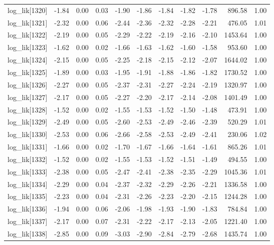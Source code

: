 \begin{table}[ht]
\begin{tabular}{rrrrrrrrrrr}
  log\_lik[1320] & -1.84 & 0.00 & 0.03 & -1.90 & -1.86 & -1.84 & -1.82 & -1.78 & 896.58 & 1.00 \\ 
  log\_lik[1321] & -2.32 & 0.00 & 0.06 & -2.44 & -2.36 & -2.32 & -2.28 & -2.21 & 476.05 & 1.01 \\ 
  log\_lik[1322] & -2.19 & 0.00 & 0.05 & -2.29 & -2.22 & -2.19 & -2.16 & -2.10 & 1453.64 & 1.00 \\ 
  log\_lik[1323] & -1.62 & 0.00 & 0.02 & -1.66 & -1.63 & -1.62 & -1.60 & -1.58 & 953.60 & 1.00 \\ 
  log\_lik[1324] & -2.15 & 0.00 & 0.05 & -2.25 & -2.18 & -2.15 & -2.12 & -2.07 & 1644.02 & 1.00 \\ 
  log\_lik[1325] & -1.89 & 0.00 & 0.03 & -1.95 & -1.91 & -1.88 & -1.86 & -1.82 & 1730.52 & 1.00 \\ 
  log\_lik[1326] & -2.27 & 0.00 & 0.05 & -2.37 & -2.31 & -2.27 & -2.24 & -2.19 & 1320.97 & 1.00 \\ 
  log\_lik[1327] & -2.17 & 0.00 & 0.05 & -2.27 & -2.20 & -2.17 & -2.14 & -2.08 & 1401.49 & 1.00 \\ 
  log\_lik[1328] & -1.52 & 0.00 & 0.02 & -1.55 & -1.53 & -1.52 & -1.50 & -1.48 & 473.91 & 1.00 \\ 
  log\_lik[1329] & -2.49 & 0.00 & 0.05 & -2.60 & -2.53 & -2.49 & -2.46 & -2.39 & 520.29 & 1.01 \\ 
  log\_lik[1330] & -2.53 & 0.00 & 0.06 & -2.66 & -2.58 & -2.53 & -2.49 & -2.41 & 230.06 & 1.02 \\ 
  log\_lik[1331] & -1.66 & 0.00 & 0.02 & -1.70 & -1.67 & -1.66 & -1.64 & -1.61 & 865.26 & 1.01 \\ 
  log\_lik[1332] & -1.52 & 0.00 & 0.02 & -1.55 & -1.53 & -1.52 & -1.51 & -1.49 & 494.55 & 1.00 \\ 
  log\_lik[1333] & -2.38 & 0.00 & 0.05 & -2.47 & -2.41 & -2.38 & -2.35 & -2.29 & 1045.36 & 1.01 \\ 
  log\_lik[1334] & -2.29 & 0.00 & 0.04 & -2.37 & -2.32 & -2.29 & -2.26 & -2.21 & 1336.58 & 1.00 \\ 
  log\_lik[1335] & -2.23 & 0.00 & 0.04 & -2.31 & -2.26 & -2.23 & -2.20 & -2.15 & 1244.28 & 1.00 \\ 
  log\_lik[1336] & -1.94 & 0.00 & 0.06 & -2.06 & -1.98 & -1.93 & -1.90 & -1.83 & 784.84 & 1.00 \\ 
  log\_lik[1337] & -2.17 & 0.00 & 0.07 & -2.31 & -2.22 & -2.17 & -2.13 & -2.05 & 1221.40 & 1.00 \\ 
  log\_lik[1338] & -2.85 & 0.00 & 0.09 & -3.03 & -2.90 & -2.84 & -2.79 & -2.68 & 1435.74 & 1.00 \\ 

\end{tabular}
\end{table}

